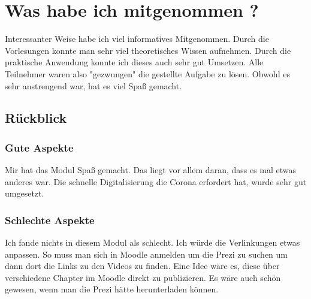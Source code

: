 \chapter{Was habe ich mitgenommen ? }

Interessanter Weise habe ich viel informatives Mitgenommen. Durch die Vorlesungen konnte man sehr viel theoretisches Wissen aufnehmen. Durch die praktische Anwendung konnte ich dieses auch sehr gut Umsetzen. Alle Teilnehmer waren also "gezwungen" die gestellte Aufgabe zu lösen. Obwohl es sehr anstrengend war, hat es viel Spaß gemacht. 




\section{Rückblick}
\subsection{Gute Aspekte}
Mir hat das Modul Spaß gemacht. Das liegt vor allem daran, dass es mal etwas anderes war. Die schnelle Digitalisierung die Corona erfordert hat, wurde sehr gut umgesetzt. 


\subsection{Schlechte Aspekte}
Ich fande nichts in diesem Modul als schlecht. Ich würde die Verlinkungen etwas anpassen. So muss man sich in Moodle anmelden um die Prezi zu suchen um dann dort die Links zu den Videos zu finden. Eine Idee wäre es, diese über verschiedene Chapter im Moodle direkt zu publizieren. Es wäre auch schön gewesen, wenn man die Prezi hätte herunterladen können.
